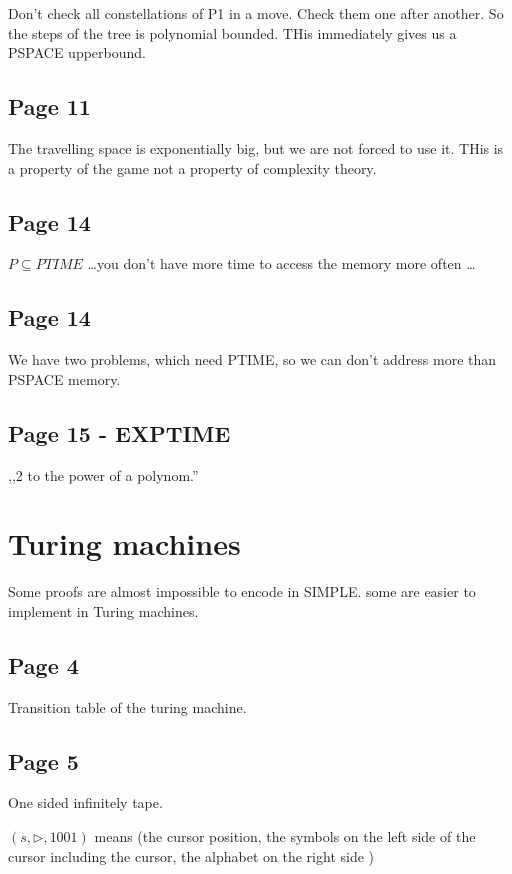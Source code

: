 \documentclass[a4paper]{article}
\newcommand{\ssym}{\triangleright}
\begin{document}
Don't check all constellations of P1 in a move. Check them one after another.
So the steps of the tree is polynomial bounded. THis immediately gives us a
PSPACE upperbound.

\subsection{Page 11}
The travelling space is exponentially big, but we are not forced to use it.
THis is a property of the game not a property of complexity theory.

\subsection{Page 14}
$P \subseteq PTIME$ \ldots you don't have more time to access the memory more
often \ldots

\subsection{Page 14}
We have two problems, which need PTIME, so we can don't address more than PSPACE
memory.

\subsection{Page 15 - EXPTIME}

,,2 to the power of a polynom.''



\section{Turing machines}

Some proofs are almost impossible to encode in SIMPLE. some are easier to
implement in Turing machines.

\subsection{Page 4 }
Transition table of the turing machine.

\subsection{Page 5}
One sided infinitely tape.

$(s, \ssym{}, 1001)$ means (the cursor position, the symbols on the left side
of the cursor including the cursor, the alphabet on the right side )
\end{document}
